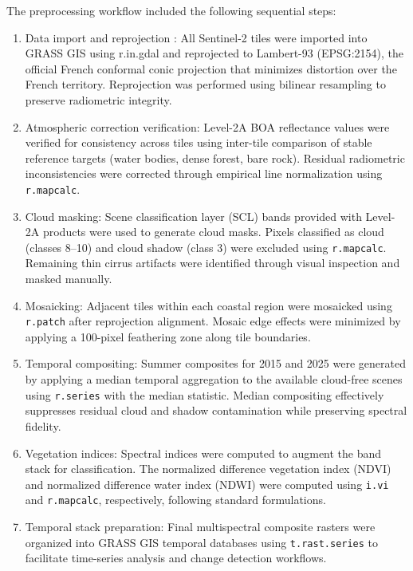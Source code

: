 \documentclass[coasts,article,accept,pdftex,moreauthors]{Definitions/mdpi}
\begin{document}
\clearpage 
The preprocessing workflow included the following sequential steps:

\begin{enumerate}[leftmargin=*,labelsep=5mm]
\item Data import and reprojection%
: All Sentinel-2 tiles were imported into GRASS GIS using r.in.gdal%
 and reprojected to Lambert-93 (EPSG:2154), the official French conformal conic projection that minimizes distortion over the French territory. Reprojection was performed using bilinear resampling to preserve radiometric integrity.

\item Atmospheric correction verification: Level-2A BOA reflectance values were verified for consistency across tiles using inter-tile comparison of stable reference targets (water bodies, dense forest, bare rock). Residual radiometric inconsistencies were corrected through empirical line normalization using \texttt{r.mapcalc}.

\item Cloud masking: Scene classification layer (SCL) bands provided with Level-2A products were used to generate cloud masks. Pixels classified as cloud (classes 8--10) and cloud shadow (class 3) were excluded using \texttt{r.mapcalc}. Remaining thin cirrus artifacts were identified through visual inspection and masked manually.

\item Mosaicking: Adjacent tiles within each coastal region were mosaicked using \texttt{r.patch} after reprojection alignment. Mosaic edge effects were minimized by applying a 100-pixel feathering zone along tile boundaries.

\item Temporal compositing: Summer composites for 2015 and 2025 were generated by applying a median temporal aggregation to the available cloud-free scenes using \texttt{r.series} with the median statistic. Median compositing effectively suppresses residual cloud and shadow contamination while preserving spectral fidelity.

\item Vegetation indices: Spectral indices were computed to augment the band stack for classification. The normalized difference vegetation index (NDVI) and normalized difference water index (NDWI) were computed using \texttt{i.vi} and \texttt{r.mapcalc}, respectively, following standard formulations.

\item Temporal stack preparation: Final multispectral composite rasters were organized into GRASS GIS temporal databases using \texttt{t.rast.series} to facilitate time-series analysis and change detection workflows.
\end{enumerate}
\end{document}
